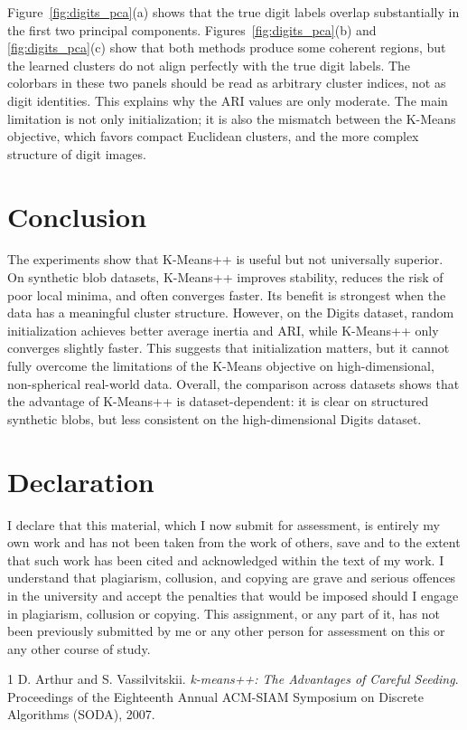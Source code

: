 \documentclass[11pt]{article}
\begin{document}
Figure~\ref{fig:digits_pca}(a) shows that the true digit labels overlap substantially in the first two principal components. Figures~\ref{fig:digits_pca}(b) and \ref{fig:digits_pca}(c) show that both methods produce some coherent regions, but the learned clusters do not align perfectly with the true digit labels. The colorbars in these two panels should be read as arbitrary cluster indices, not as digit identities. This explains why the ARI values are only moderate. The main limitation is not only initialization; it is also the mismatch between the K-Means objective, which favors compact Euclidean clusters, and the more complex structure of digit images.

\section{Conclusion}
\vspace{-0.1cm}
The experiments show that K-Means++ is useful but not universally superior. On synthetic blob datasets, K-Means++ improves stability, reduces the risk of poor local minima, and often converges faster. Its benefit is strongest when the data has a meaningful cluster structure. However, on the Digits dataset, random initialization achieves better average inertia and ARI, while K-Means++ only converges slightly faster. This suggests that initialization matters, but it cannot fully overcome the limitations of the K-Means objective on high-dimensional, non-spherical real-world data. Overall, the comparison across datasets shows that the advantage of K-Means++ is dataset-dependent: it is clear on structured synthetic blobs, but less consistent on the high-dimensional Digits dataset.

\section*{Declaration}
\vspace{-0.15cm}
I declare that this material, which I now submit for assessment, is entirely my own work and has not been taken from the work of others, save and to the extent that such work has been cited and acknowledged within the text of my work. I understand that plagiarism, collusion, and copying are grave and serious offences in the university and accept the penalties that would be imposed should I engage in plagiarism, collusion or copying. This assignment, or any part of it, has not been previously submitted by me or any other person for assessment on this or any other course of study.

\vspace{-0.15cm}
\begin{thebibliography}{1}
D. Arthur and S. Vassilvitskii. \textit{k-means++: The Advantages of Careful Seeding}. Proceedings of the Eighteenth Annual ACM-SIAM Symposium on Discrete Algorithms (SODA), 2007.
\end{thebibliography}
\end{document}
